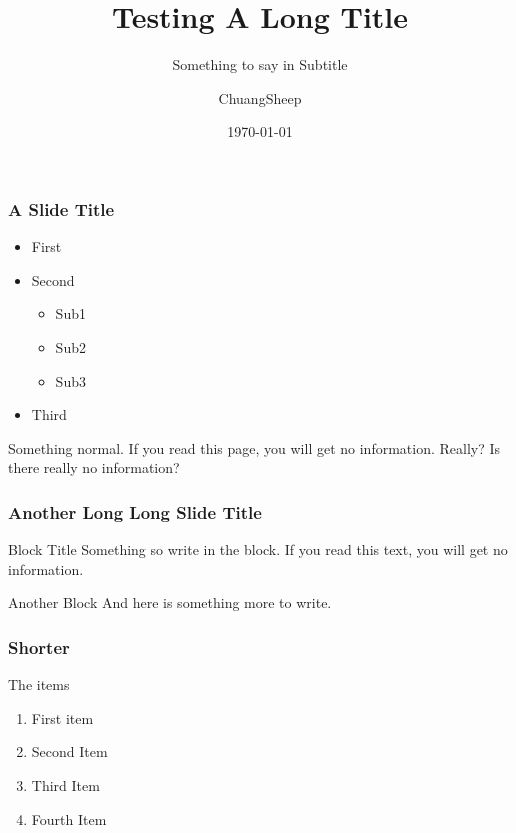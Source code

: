 \documentclass[american,aspectratio=169]{beamer}
\title{Testing A Long Title}
\subtitle{Something to say in Subtitle}
\date{\today}
\author{ChuangSheep}
\begin{document}
\begin{frame} 
  \titlepage
\end{frame} 


\begin{iframe}
  \frametitle{A Slide Title}
  
  \begin{itemize}
    \item First
    \item Second 
    \begin{itemize}
      \item Sub1
      \item Sub2
      \item Sub3
    \end{itemize}
    \item Third
  \end{itemize}

  Something normal. If you read this page, you will get no information. Really? Is there really no information?
\end{iframe}

\begin{indentedframe}
  \frametitle{Another Long Long Slide Title}
  \begin{block}{Block Title}
    Something so write in the block. If you read this text, you will get no information. 
  \end{block}
  \begin{block}{Another Block}
    And here is something more to write. 
  \end{block}
\end{indentedframe}

\begin{indentedframe}
  \frametitle{Shorter}

  \begin{block}{The items}
  \end{block}

  \begin{enumerate}
    \item First item
    \item Second Item
    \item Third Item
    \item Fourth Item
  \end{enumerate}
\end{indentedframe}

\end{document}
